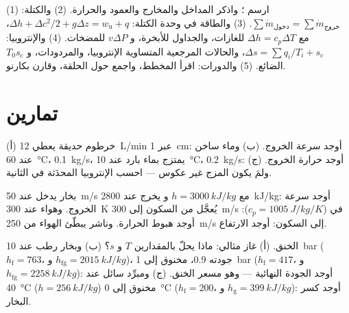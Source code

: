 \begin{method}\label{meth:b2:open-systems:method}
(1) ارسم ؛ واذكر المداخل والمخارج والعمود والحرارة.
(2) والكتلة: $\sum\dot m_{\text{دخول}} = \sum\dot m_{\text{خروج}}$. (3) والطاقة
في وحدة الكتلة: $\Delta h + \Delta c^2/2 + g\Delta z = w_{\text{u}} + q$، مع
$\Delta h = c_p\Delta T$ للغازات، والجداول للأبخرة، و $v\Delta P$
للمضخات. (4) والإنتروبيا: $\Delta s = \sum q_i/T_i + s_{\text{c}}$، والحالات
المرجعية المتساوية الإنتروبيا، والمردودات، و $T_0s_{\text{c}}$ الضائع. (5) والدورات: اقرأ
المخطط، واجمع حول الحلقة، وقارن بكارنو.
\end{method}

\section{تمارين}

\begin{exercise}[$\star$]\label{exo:b2:open-systems:1}
(أ) خرطوم حديقة يعطي \qty{12}{L/min} عبر  \qty{1}{cm}:
أوجد سرعة الخروج. (ب) وماء ساخن عند \qty{60}{\celsius}، \qty{0.1}{kg/s}،
يمتزج بماء بارد عند \qty{10}{\celsius}، \qty{0.2}{kg/s}: أوجد حرارة
الخروج. (ج) ولمَ يكون المزج غير عكوس --- احسب
الإنتروبيا المحدَثة في الثانية.
\end{exercise}

\begin{exercise}[$\star$]\label{exo:b2:open-systems:2}
بخار يدخل  عند \qty{50}{m/s} مع $h = \qty{3000}{kJ/kg}$ و
يخرج عند \qty{2800}{kJ/kg}: أوجد سرعة الخروج. وهواء عند \qty{300}{K} يُعجَّل
من السكون إلى \qty{300}{m/s} في  ($c_p = \qty{1005}{J/kg/K}$):
أوجد هبوط الحرارة. وناشر يبطّئ الهواء من \qty{250}{m/s} إلى السكون: أوجد الارتفاع.
\end{exercise}

\begin{exercise}[$\star$]\label{exo:b2:open-systems:3}
الخنق. (أ) غاز مثالي: ماذا يحلّ بالمقدارين $T$ و $s$؟ (ب) وبخار رطب
عند \qty{10}{bar} ($h_{\text{f}} = 763$، و $h_{\text{fg}} = \qty{2015}{kJ/kg}$)،
جودته $0.9$، مخنوق إلى \qty{1}{bar} ($h_{\text{f}} = 417$، و $h_{\text{fg}}
= \qty{2258}{kJ/kg}$): أوجد الجودة النهائية --- وهو مسعر الخنق. (ج)
ومبرِّد سائل عند \qty{40}{\celsius} ($h = \qty{256}{kJ/kg}$) مخنوق
إلى \qty{0}{\celsius} ($h_{\text{f}} = 200$، و $h_{\text{g}} = \qty{399}{kJ/kg}$):
أوجد كسر البخار.
\end{exercise}

